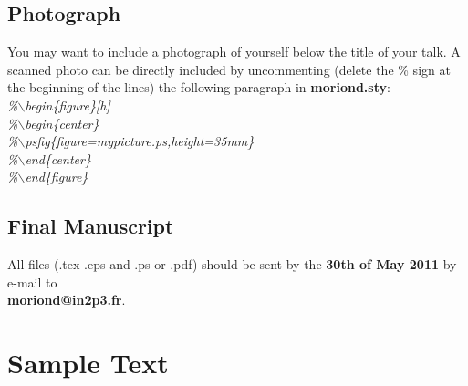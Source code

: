\documentclass[11pt]{article}
\begin{document}
\subsection{Photograph}
You may want to include a photograph of yourself below the title
of your talk. A scanned photo can be 
directly included by uncommenting (delete the \% sign at the beginning of 
the lines) the following paragraph in {\bf moriond.sty}:\\
{\em \%$\backslash$begin\{figure\}[h]}\\
{\em \%$\backslash$begin\{center\}}\\
{\em \%$\backslash$psfig\{figure=mypicture.ps,height=35mm\}}\\
{\em \%$\backslash$end\{center\}}\\
{\em \%$\backslash$end\{figure\}}\\


\subsection{Final Manuscript}\label{subsec:final}

All files (.tex .eps and .ps or .pdf) should be sent by the {\bf 30th of May 2011}
by e-mail 
to \\
{\bf moriond@in2p3.fr}.\\

\section{Sample Text }
\end{document}
